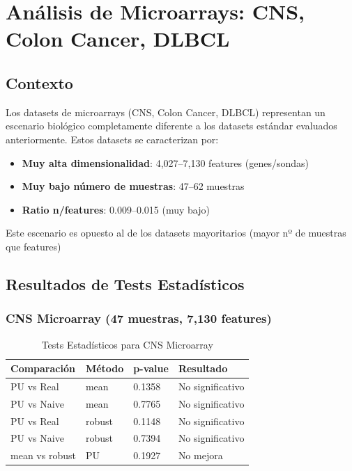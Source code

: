 \documentclass[a4paper,11pt]{article}
\begin{document}
\section{Análisis de Microarrays: CNS, Colon Cancer, DLBCL}

\subsection{Contexto}

Los datasets de microarrays (CNS, Colon Cancer, DLBCL) representan un escenario biológico completamente diferente a los datasets estándar evaluados anteriormente. Estos datasets se caracterizan por:

\begin{itemize}
    \item \textbf{Muy alta dimensionalidad}: 4{,}027--7{,}130 features (genes/sondas)
    \item \textbf{Muy bajo número de muestras}: 47--62 muestras
    \item \textbf{Ratio n/features}: 0.009--0.015 (muy bajo)
\end{itemize}

Este escenario es opuesto al de los datasets mayoritarios (mayor nº de muestras que features)

\subsection{Resultados de Tests Estadísticos}

\subsubsection{CNS Microarray (47 muestras, 7{,}130 features)}

\begin{table}[H]
\centering
\caption{Tests Estadísticos para CNS Microarray}
\begin{tabular}{llll}
\toprule
Comparación & Método & p-value & Resultado \\
\midrule
PU vs Real & mean & 0.1358 & {No significativo} \\
PU vs Naive & mean & 0.7765 & {No significativo} \\
PU vs Real & robust & 0.1148 & {No significativo} \\
PU vs Naive & robust & 0.7394 & {No significativo} \\
mean vs robust & PU & 0.1927 & {No mejora} \\
\bottomrule
\end{tabular}
\end{table}
\end{document}
